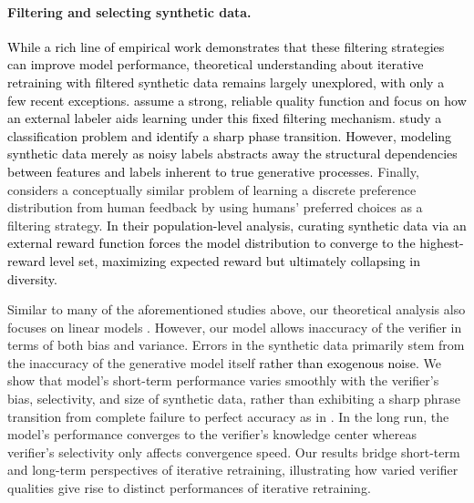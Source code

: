 \vspace{-2mm}
\paragraph{Filtering and selecting synthetic data.}
\textcolor{black}{While a rich line of empirical work demonstrates that these filtering strategies can improve model performance,
theoretical understanding about iterative retraining with filtered synthetic data remains largely unexplored, with only a few recent exceptions.}
\textcolor{black}{\citet{amin2025escaping} assume a strong, reliable quality function and focus on how an external labeler aids learning under this fixed filtering mechanism. 
\citet{feng2024beyond} study a classification problem and identify a sharp phase transition.
However, modeling synthetic data merely as noisy labels abstracts away the structural dependencies between features and labels inherent to true generative processes.
}
Finally, \citet{ferbach2024self,weiself} considers a conceptually similar problem of learning  a discrete preference distribution from human feedback by using humans' preferred choices as a filtering strategy.
\textcolor{black}{In their population-level analysis, curating synthetic data via an external reward function forces the model distribution to converge to the highest-reward level set, maximizing expected reward but ultimately collapsing in diversity.}

Similar to many of the aforementioned studies above, our theoretical analysis also focuses on linear models \citep{feng2024beyond,dohmatobstrong,gerstgrasser2024model}.
However, our model allows inaccuracy of the verifier in terms of both bias and variance.
Errors in the synthetic data primarily stem from the inaccuracy of the generative model itself \textcolor{black}{rather than exogenous noise}.
We show that model's short-term performance varies smoothly with the verifier's bias, selectivity, and  size of synthetic data, rather than exhibiting a sharp phrase transition from complete failure to perfect accuracy as in \citet{feng2024beyond}.
In the long run, the model's performance converges to the verifier's knowledge center whereas verifier's selectivity only affects convergence speed.
Our results bridge short-term and long-term perspectives of iterative retraining, illustrating  how varied verifier qualities give rise to distinct performances of iterative retraining.


